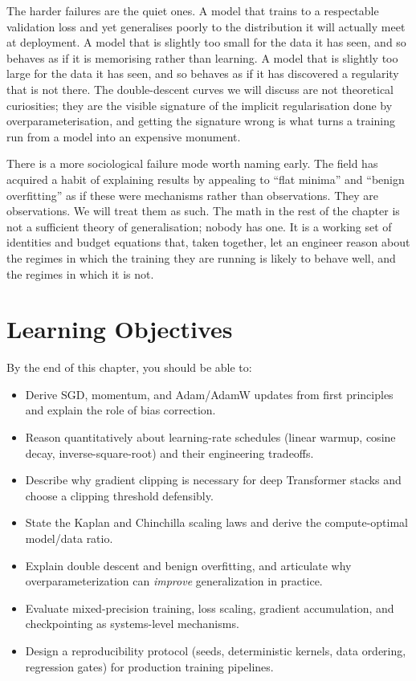 The harder failures are the quiet ones. A model that trains to a
respectable validation loss and yet generalises poorly to the
distribution it will actually meet at deployment. A model that is
slightly too small for the data it has seen, and so behaves as if
it is memorising rather than learning. A model that is slightly
too large for the data it has seen, and so behaves as if it has
discovered a regularity that is not there. The double-descent
curves we will discuss are not theoretical curiosities; they are
the visible signature of the implicit regularisation done by
overparameterisation, and getting the signature wrong is what
turns a training run from a model into an expensive monument.

There is a more sociological failure mode worth naming early. The
field has acquired a habit of explaining results by appealing to
``flat minima'' and ``benign overfitting'' as if these were
mechanisms rather than observations. They are observations. We
will treat them as such. The math in the rest of the chapter is
not a sufficient theory of generalisation; nobody has one. It is
a working set of identities and budget equations that, taken
together, let an engineer reason about the regimes in which the
training they are running is likely to behave well, and the
regimes in which it is not.

\section{Learning Objectives}

By the end of this chapter, you should be able to:
\begin{itemize}
  \item Derive SGD, momentum, and Adam/AdamW updates from first principles and
        explain the role of bias correction.
  \item Reason quantitatively about learning-rate schedules (linear warmup,
        cosine decay, inverse-square-root) and their engineering tradeoffs.
  \item Describe why gradient clipping is necessary for deep Transformer
        stacks and choose a clipping threshold defensibly.
  \item State the Kaplan and Chinchilla scaling laws and derive the
        compute-optimal model/data ratio.
  \item Explain double descent and benign overfitting, and articulate why
        overparameterization can \emph{improve} generalization in practice.
  \item Evaluate mixed-precision training, loss scaling, gradient
        accumulation, and checkpointing as systems-level mechanisms.
  \item Design a reproducibility protocol (seeds, deterministic kernels,
        data ordering, regression gates) for production training pipelines.
\end{itemize}

